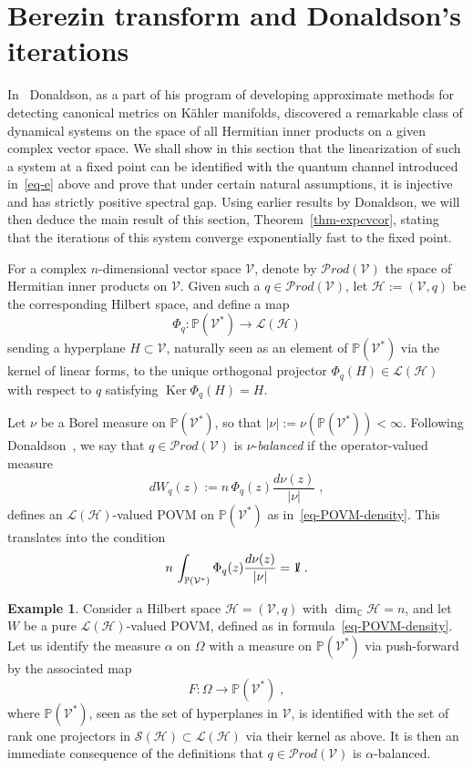 \documentclass[11pt]{article}
\theoremstyle{definition}
\newtheorem{exam}[theo]{Example}
\numberwithin{equation}{section}
\numberwithin{figure}{section}
\numberwithin{table}{section}
\DeclareMathOperator{\Ker}{Ker}
\newcommand{\PPP}{{\mathbb{P}}}
\newcommand{\CCC}{{\mathbb{C}}}
\newcommand{\cH}{{\mathcal{H}}}
\newcommand{\cS}{{\mathcal{S}}}
\newcommand{\cV}{{\mathcal{V}}}
\newcommand*\id{{1\hskip-2.5pt{\rm l}}}
\newcommand{\Om}{\Omega}
\newcommand\< {\mathcal{h}}
\renewcommand\> {\mathcal{i}}
\newcommand*\cL{\mathscr{L}}
\newcommand{\Prod}{{\mathcal Prod}}
\begin{document}
\section{Berezin transform and Donaldson's iterations}\label{sec-don}
In~\cite{D} Donaldson, as a part of his program of developing approximate methods for detecting canonical metrics on K\"ahler manifolds, discovered a remarkable class of dynamical systems on the space of all Hermitian inner products on a given complex vector space. We shall show in this section that the linearization of such a system at a fixed point can be identified with the quantum channel introduced in~\eqref{eq-e} above and prove that under certain natural assumptions, it is injective and has strictly positive spectral gap. Using earlier results by Donaldson, we will then deduce the main result of this section, Theorem~\ref{thm-expcvcor}, stating that the iterations of this system converge exponentially fast to the fixed point.

For a complex $n$-dimensional vector space $\cV$, denote by $\Prod(\cV)$ the space of Hermitian inner products on $\cV$. Given such a $q\in\Prod(\cV)$, let $\cH:=(\cV,q)$ be the corresponding Hilbert space, and define a map
\begin{equation}\label{Psiqdef}
\Phi_q: \PPP (\cV^*)\longrightarrow\cL(\cH)
\end{equation}
sending a hyperplane $H\subset\cV$, naturally seen as an element of $\PPP(\cV^*)$ via the kernel of linear forms, to the unique orthogonal projector $\Phi_q(H)\in\cL(\cH)$ with respect to $q$ satisfying $\Ker\Phi_q(H)=H$.

Let $\nu$ be a Borel measure on $\PPP (\cV^*)$, so that $|\nu|:= \nu(\PPP (\cV^*)) < \infty$. Following Donaldson~\cite[p.~581]{D}, we say that $q \in \Prod(\cV)$ is $\nu$-\emph{balanced} if the operator-valued measure
\begin{equation}\label{eq-Donaldson-POVM}
dW_q(z):= n\,\Phi_q(z) \frac{d\nu(z)}{|\nu|}\;,
\end{equation}
defines an $\cL(\cH)$-valued POVM on $\PPP (\cV^*)$ as in~\eqref{eq-POVM-density}. This translates into the condition
\begin{equation}\label{eq-Donaldson-POVM-1}
n\,\int_{\PPP (\cV^*)} \Phi_q(z) \frac{d\nu(z)}{|\nu|} = \id\;.
\end{equation}

\begin{exam}\label{exam-general}
Consider a Hilbert space $\cH=(\cV,q)$ with $\dim_\CCC\cH=n$, and let $W$ be a pure $\cL(\cH)$-valued POVM, defined as in formula~\eqref{eq-POVM-density}. Let us identify the measure $\alpha$ on $\Om$ with a measure on $\PPP(\cV^*)$ via push-forward by the associated map
\begin{equation}\label{Fdef}
F:\Om\longrightarrow\PPP(\cV^*)\;,
\end{equation}
where $\PPP(\cV^*)$, seen as the set of hyperplanes in $\cV$, is identified with the set of rank one projectors in $\cS(\cH)\subset\cL(\cH)$ via their kernel as above. It is then an immediate consequence of the definitions that $q\in\Prod(\cV)$ is $\alpha$-balanced.
\end{exam}
\end{document}
